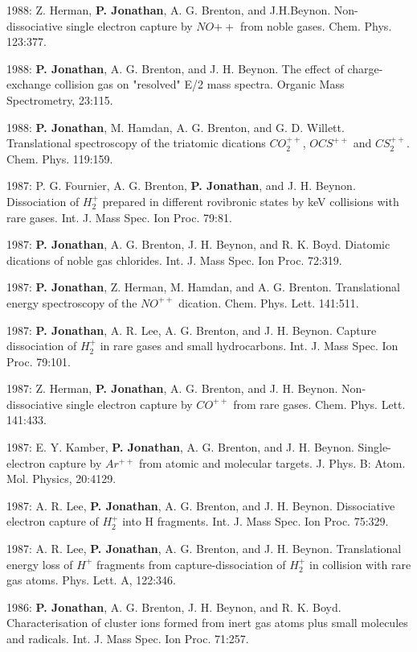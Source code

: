 \documentclass[11pt,a4paper]{moderncv}
\begin{document}
1988: Z. Herman, \textbf{P. Jonathan}, A. G. Brenton, and J.H.Beynon. Non-dissociative single electron capture by $NO{++}$ from noble gases. Chem. Phys. 123:377.

1988: \textbf{P. Jonathan}, A. G. Brenton, and J. H. Beynon. The effect of charge-exchange collision gas on "resolved" E/2 mass spectra. Organic Mass Spectrometry, 23:115.

1988: \textbf{P. Jonathan}, M. Hamdan, A. G. Brenton, and G. D. Willett. Translational spectroscopy of the triatomic dications $CO_2^{++}$, $OCS^{++}$ and $CS_2^{++}$. Chem. Phys. 119:159.

1987: P. G. Fournier, A. G. Brenton, \textbf{P. Jonathan}, and J. H. Beynon. Dissociation of $H_2^+$ prepared in different rovibronic states by keV collisions with rare gases. Int. J. Mass Spec. Ion Proc. 79:81.

1987: \textbf{P. Jonathan}, A. G. Brenton, J. H. Beynon, and R. K. Boyd. Diatomic dications of noble gas chlorides. Int. J. Mass Spec. Ion Proc. 72:319.

1987: \textbf{P. Jonathan}, Z. Herman, M. Hamdan, and A. G. Brenton. Translational energy spectroscopy of the $NO^{++}$ dication. Chem. Phys. Lett. 141:511.

1987: \textbf{P. Jonathan}, A. R. Lee, A. G. Brenton, and J. H. Beynon. Capture dissociation of $H_2^+$ in rare gases and small hydrocarbons. Int. J. Mass Spec. Ion Proc. 79:101.

1987: Z. Herman, \textbf{P. Jonathan}, A. G. Brenton, and J. H. Beynon. Non-dissociative single electron capture by $CO^{++}$ from rare gases. Chem. Phys. Lett. 141:433.

1987: E. Y. Kamber, \textbf{P. Jonathan}, A. G. Brenton, and J. H. Beynon. Single-electron capture by $Ar^{++}$ from atomic and molecular targets. J. Phys. B: Atom. Mol. Physics, 20:4129.

1987: A. R. Lee, \textbf{P. Jonathan}, A. G. Brenton, and J. H. Beynon. Dissociative electron capture of $H_2^+$ into H fragments. Int. J. Mass Spec. Ion Proc. 75:329.

1987: A. R. Lee, \textbf{P. Jonathan}, A. G. Brenton, and J. H. Beynon. Translational energy loss of $H^+$ fragments from capture-dissociation of $H_2^+$ in collision with rare gas atoms. Phys. Lett. A, 122:346.

1986: \textbf{P. Jonathan}, A. G. Brenton, J. H. Beynon, and R. K. Boyd. Characterisation of cluster ions formed from inert gas atoms plus small molecules and radicals. Int. J. Mass Spec. Ion Proc. 71:257.
\end{document}
